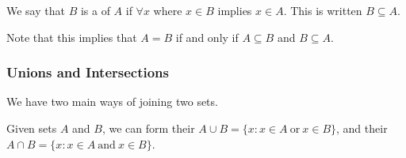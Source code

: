 \documentclass[a4paper]{scrartcl}
\begin{document}
\begin{definition}[Subsets]
	We say that $B$ is a  of $A$ if $\forall x$ where $x \in B$ implies $x \in A$. This is written $B \subseteq A$.
\end{definition}


	






Note that this implies that $A = B$ if and only if $A \subseteq B$ and $B \subseteq A$.

\subsubsection{Unions and Intersections}

We have two main ways of joining two sets.

\begin{definition}
	Given sets $A$ and $B$, we can form their  $A \cup B = \{x : x \in A \ \text{or}\ x \in B\}$, and their  $A \cap B = \{x  : x \in A \ \text{and}\ x \in B\}$. 
\end{definition} 
\end{document}
